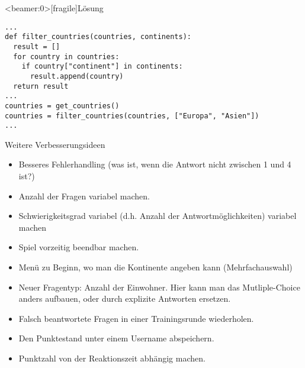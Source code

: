 \begin{frame}<beamer:0>[fragile]{Lösung}
	
\begin{solutionblock}{}
\begin{verbatim}
...
def filter_countries(countries, continents):
  result = []
  for country in countries:
    if country["continent"] in continents:
      result.append(country)
  return result
...
countries = get_countries()
countries = filter_countries(countries, ["Europa", "Asien"])
...
\end{verbatim}
\end{solutionblock}
\end{frame}


\begin{frame}
\begin{block}{Weitere Verbesserungsideen}
	\pause 
\begin{itemize}[<+->]
  \item Besseres Fehlerhandling (was ist, wenn die Antwort nicht zwischen 1 und 4 ist?)
  \item Anzahl der Fragen variabel machen. 
  \item Schwierigkeitsgrad variabel (d.h. Anzahl der Antwortmöglichkeiten) variabel machen
  \item Spiel vorzeitig beendbar machen. 
  \item Menü zu Beginn, wo man die Kontinente angeben kann (Mehrfachauswahl)
  \item Neuer Fragentyp: Anzahl der Einwohner. Hier kann man das Mutliple-Choice anders aufbauen, oder durch explizite Antworten ersetzen. 
  \item Falsch beantwortete Fragen in einer Trainingsrunde wiederholen.  
  \item Den Punktestand unter einem Username abspeichern.
  \item Punktzahl von der Reaktionszeit abhängig machen. 
\end{itemize}
\end{block}
\end{frame}